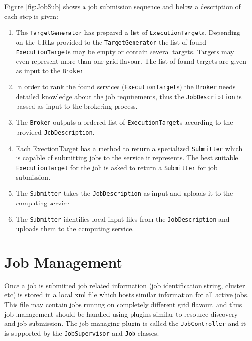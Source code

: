 \documentclass{book}
\newcommand{\TargetGenerator}{\texttt{TargetGenerator}}
\newcommand{\ExecutionTarget}{\texttt{ExecutionTarget}}
\newcommand{\Broker}{\texttt{Broker}}
\newcommand{\Submitter}{\texttt{Submitter}}
\newcommand{\JobDescription}{\texttt{JobDescription}}
\newcommand{\JobSupervisor}{\texttt{JobSupervisor}}
\newcommand{\JobController}{\texttt{JobController}}
\newcommand{\Job}{\texttt{Job}}
\begin{document}
Figure \ref{fig:JobSub} shows a job submission sequence and below a description of each step is given:

\begin{enumerate}
\item{The {\TargetGenerator} has prepared a list of {\ExecutionTarget}s. Depending on the URLs provided to the {\TargetGenerator} the list of 
found {\ExecutionTarget}s may be empty or contain several targets. Targets may even represent more than one grid flavour. The list of 
found targets are given as input to the {\Broker}.}
\item{In order to rank the found services ({\ExecutionTarget}s) the {\Broker} needs detailed knowledge about the job requirements, thus the 
{\JobDescription} is passed as input to the brokering process.}
\item{The {\Broker} outputs a ordered list of {\ExecutionTarget}s according to the provided {\JobDescription}.}
\item{Each ExectionTarget has a method to return a specialized {\Submitter} which is capable of submitting jobs to the service it 
represents. The best suitable {\ExecutionTarget} for the job is asked to return a {\Submitter} for job submission.}
\item{The {\Submitter} takes the {\JobDescription} as input and uploads it to the computing service.}
\item{The {\Submitter} identifies local input files from the {\JobDescription} and uploads them to the computing service.}
\end{enumerate}

\section{Job Management}
Once a job is submitted job related information (job identification string, cluster etc) is stored in a local xml file which hosts 
similar information for all active jobs. This file may contain jobs runnng on completely different grid flavour, and thus job 
management should be handled using plugins similar to resource discovery and job submission. The job managing plugin is called 
the {\JobController} and it is supported by the {\JobSupervisor} and {\Job} classes.
\end{document}
